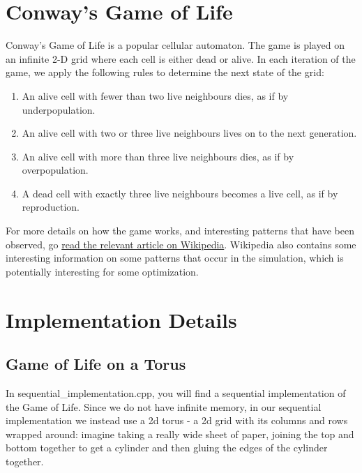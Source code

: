 \documentclass[11pt]{article}
\date{\today}
\title{\realtitle}
\begin{document}
\maketitle
\tableofcontents
\pagebreak


\section{Conway's Game of Life}
\label{sec:org43e406f}

Conway's Game of Life is a popular cellular automaton. The game is played on an infinite 2-D grid where
each cell is either dead or alive. In each iteration of the game, we apply the following rules to determine the
next state of the grid:

\begin{enumerate}
\item An alive cell with fewer than two live neighbours dies, as if by underpopulation.
\item An alive cell with two or three live neighbours lives on to the next generation.
\item An alive cell with more than three live neighbours dies, as if by overpopulation.
\item A dead cell with exactly three live neighbours becomes a live cell, as if by reproduction.
\end{enumerate}

For more details on how the game works, and interesting patterns that have been observed, go 
\href{https://en.wikipedia.org/wiki/Conway\%27s\_Game\_of\_Life}{read the relevant article on Wikipedia}. Wikipedia also contains some interesting information on some patterns that occur in the simulation, which is potentially interesting for some optimization.

\section{Implementation Details}
\label{sec:org08308a6}

\subsection{Game of Life on a Torus}
\label{sec:org14c5ce7}

In sequential\_implementation.cpp, you will find a sequential implementation of the Game of Life. Since we do not have infinite
memory, in our sequential implementation we instead use a 2d torus - a 2d grid with its columns
and rows wrapped around: imagine taking a really wide sheet of paper, joining the top and bottom together
to get a cylinder and then gluing the edges of the cylinder together.
\end{document}
